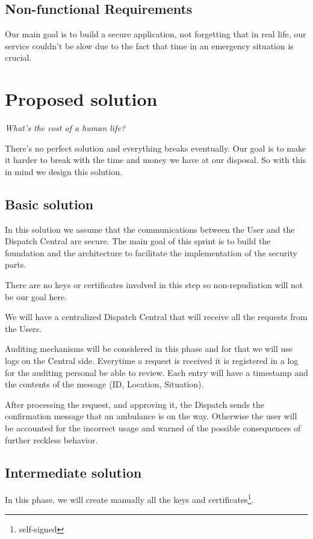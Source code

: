 \documentclass[a4paper,titlepage,11pt]{article}
\begin{document}
\subsection{Non-functional Requirements}
Our main goal is to build a secure application, not forgetting that in real life,
our service couldn't be slow due to the fact that time in an emergency situation is crucial.

\section{Proposed solution}

\begin{center}
  \textit{What's the cost of a human life?}
\end{center}

There's no perfect solution and everything breaks eventually.
Our goal is to make it harder to break with the time and money we have at our disposal.
So with this in mind we design this solution.

\subsection{Basic solution}
In this solution we assume that the communications between the User and the Dispatch Central are secure.
The main goal of this sprint is to build the foundation and the architecture to facilitate the implementation of the security parts.

There are no keys or certificates involved in this step so non-repudiation will not be our goal here.

We will have a centralized Dispatch Central that will receive all the requests from the Users.

Auditing mechanisms will be considered in this phase and for that we will use logs on the Central side.
Everytime a request is received it is registered in a log for the auditing personal be able to review.
Each entry will have a timestamp and the contents of the message (ID, Location, Situation).

After processing the request, and approving it, the Dispatch sends the confirmation message that an ambulance is on the way.
Otherwise the user will be accounted for the incorrect usage and warned of the possible consequences of further reckless behavior.

\subsection{Intermediate solution}
In this phase, we will create manually all the keys and certificates\footnote{self-signed}.
\end{document}
